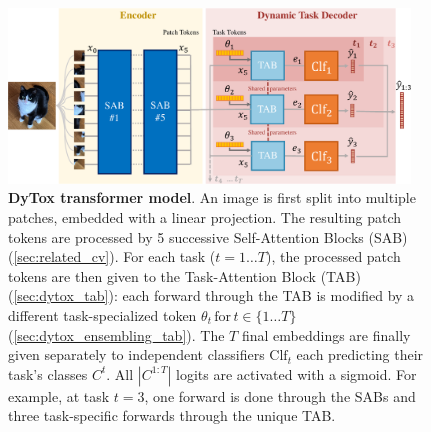 \begin{figure}
    \centering
    \includegraphics[width=0.95\textwidth]{images/dytox/dytox.pdf}
    \caption{\textbf{DyTox transformer model}. An image is first split into multiple patches,
    embedded with a linear projection. The resulting patch tokens are processed by 5 successive
    Self-Attention Blocks (SAB) (\autoref{sec:related_cv}). For each task ($t = 1\dots T$), the processed
    patch tokens are then given to the Task-Attention Block (TAB) (\autoref{sec:dytox_tab}): each forward
    through the TAB is modified by a different task-specialized token $\theta_t\, \text{for}\, t \in
        \{1 \dots T\}$ (\autoref{sec:dytox_ensembling_tab}). The $T$ final embeddings are finally given
    separately to independent classifiers $\text{Clf}_t$ each predicting their task's classes $C^t$.
    All $|C^{1:T}|$ logits are activated with a sigmoid. For example, at task $t=3$, one forward is
    done through the SABs and three task-specific forwards through the unique TAB.}
    \label{fig:dytox_model}
\end{figure}

\label{sec:dytox_problem}


